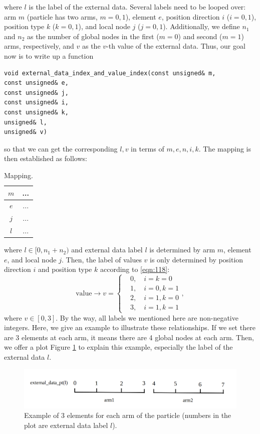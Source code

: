 \documentclass[a4paper,12pt]{article}
\begin{document}
where $l$ is the label of the external data.
Several labels need to be looped over: 
arm $m$ (particle has two arms, $m=0,1$), element $e$, position direction $i$ ($i=0,1$), position type $k$ ($k=0,1$), and local node $j$ ($j=0,1$). Additionally, we define $n_1$ and $n_2$ as the number of global nodes in the first ($m=0$) and second ($m=1$) arms, respectively, and $v$ as the $v$-th value of the external data. Thus, our goal now is to write up a function 
\begin{lstlisting}
void external_data_index_and_value_index(const unsigned& m,
const unsigned& e,
const unsigned& j,
const unsigned& i,
const unsigned& k,
unsigned& l,
unsigned& v)	
\end{lstlisting}
so that we can get the corresponding $l,v$ in terms of $m,e,n,i,k$.
The mapping is then established as follows:
\begin{table}[h]
	\centering
	\caption{Mapping.}  
	\label{tab:1}
	\begin{tabular}{ |c|c| } 
		\hline
		$m$ & ...  \\ 
		\hline
		$e$ & ...  \\ 
		\hline
		$j$ & ...  \\ 
		\hline
		$l$ & ... \\
		\hline
	\end{tabular}
\end{table}
where $l\in [0,n_1+n_2)$ and external data label $l$ is determined by arm $m$, element $e$, and local node $j$. Then, the label of values $v$ is only determined by position direction $i$ and position type $k$ according to \eqref{eqn:118}:
\begin{equation}
	\label{eqn:119}
	\text{value}\rightarrow v=\left\{\begin{aligned}
		&0,\quad i=k=0\\
		&1,\quad i=0, k=1\\
		&2,\quad i=1, k=0\\
		&3,\quad i=1, k=1
	\end{aligned}\right.,
\end{equation}
where $v\in [0,3]$. By the way, all labels we mentioned here are non-negative integers. Here, we give an example to illustrate these relationships.
If we set there are 3 elements at each arm, it means there are 4 global nodes at each arm. Then, we offer a plot Figure \ref{fig:6} to explain this example, especially the label of the external data $l$.
\begin{figure}[htb]
	\begin{center}
		\includegraphics[width=1\textwidth]{plot/example.png}
		\caption{Example of 3 elements for each arm of the particle (numbers in the plot are external data label $l$).}
		\label{fig:6}
	\end{center}
\end{figure}
\end{document}
